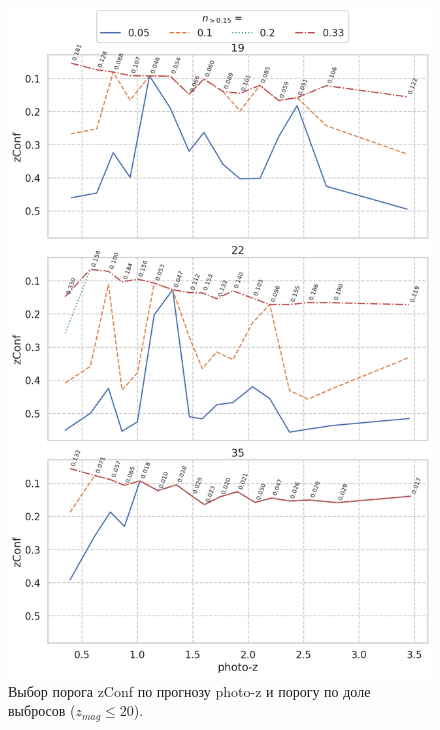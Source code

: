 \documentclass[fleqn,usenatbib]{mnras}
\begin{document}
\begin{figure}
    \centering
    \includegraphics[width=0.9\linewidth]{images/zconf-by-photo_z-x-n015_zl20.png}
    \caption{Выбор порога zConf по прогнозу photo-z и порогу по доле выбросов ($z_{mag} \leq 20$).}
    \label{fig:my_label}
\end{figure}
\end{document}
